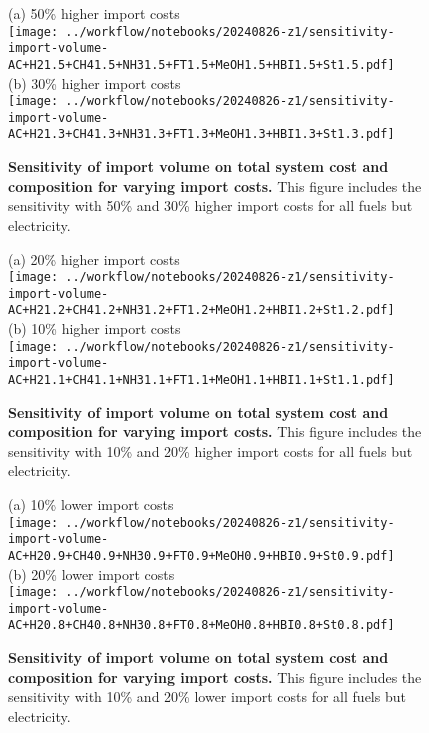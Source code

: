 \begin{figure*}
    \small
    (a) 50\% higher import costs \\
    \texttt{[image: ../workflow/notebooks/20240826-z1/sensitivity-import-volume-AC+H21.5+CH41.5+NH31.5+FT1.5+MeOH1.5+HBI1.5+St1.5.pdf]} \\
    (b) 30\% higher import costs \\
    \texttt{[image: ../workflow/notebooks/20240826-z1/sensitivity-import-volume-AC+H21.3+CH41.3+NH31.3+FT1.3+MeOH1.3+HBI1.3+St1.3.pdf]} \\
    \caption{\textbf{Sensitivity of import volume on total system cost and composition for varying import costs.} This figure includes the sensitivity with
    50\% and 30\% higher import costs for all fuels but electricity.}
    \label{fig:si:volume-higher-2}
\end{figure*}

\begin{figure*}
    \small
    (a) 20\% higher import costs \\
    \texttt{[image: ../workflow/notebooks/20240826-z1/sensitivity-import-volume-AC+H21.2+CH41.2+NH31.2+FT1.2+MeOH1.2+HBI1.2+St1.2.pdf]} \\
    (b) 10\% higher import costs \\
    \texttt{[image: ../workflow/notebooks/20240826-z1/sensitivity-import-volume-AC+H21.1+CH41.1+NH31.1+FT1.1+MeOH1.1+HBI1.1+St1.1.pdf]} \\
    \caption{\textbf{Sensitivity of import volume on total system cost and composition for varying import costs.} This figure includes the sensitivity with
    10\% and 20\% higher import costs for all fuels but electricity.}
    \label{fig:si:volume-higher-1}
\end{figure*}

\begin{figure*}
    \small
    (a) 10\% lower import costs \\
    \texttt{[image: ../workflow/notebooks/20240826-z1/sensitivity-import-volume-AC+H20.9+CH40.9+NH30.9+FT0.9+MeOH0.9+HBI0.9+St0.9.pdf]} \\
    (b) 20\% lower import costs \\
    \texttt{[image: ../workflow/notebooks/20240826-z1/sensitivity-import-volume-AC+H20.8+CH40.8+NH30.8+FT0.8+MeOH0.8+HBI0.8+St0.8.pdf]} \\
    \caption{\textbf{Sensitivity of import volume on total system cost and composition for varying import costs.} This figure includes the sensitivity with
    10\% and 20\% lower import costs for all fuels but electricity.}
    \label{fig:si:volume-lower-1}
\end{figure*}

